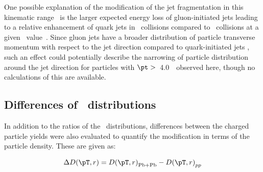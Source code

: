 One possible explanation of the modification of the 
jet fragmentation in this kinematic range~\cite{Aaboud:2018hpb} is the larger expected energy loss
of gluon-initiated jets leading to a relative enhancement of quark jets in \pbpb\ collisions compared
to \pp\ collisions at a given \ptjet\ value~\cite{Spousta:2015fca}. Since gluon jets have a broader distribution of particle transverse momentum with respect to the jet direction compared to quark-initiated jets \cite{OPAL:1995ab}
 , such an effect could potentially describe the narrowing of particle distribution around the jet direction for particles with $\pt >$~4.0~\GeV\
observed here, though no calculations of this are available.



\FloatBarrier


\subsection{Differences of \Dptr\ distributions}
In addition to the ratios of the \Dptr\ distributions, differences between the charged particle yields were also evaluated to quantify the modification in terms of the particle density. These are given as:

\begin{align}
\DeltaDptr = \Dptr_{\mathrm{Pb+Pb}} - \Dptr_{pp}
\end{align}

